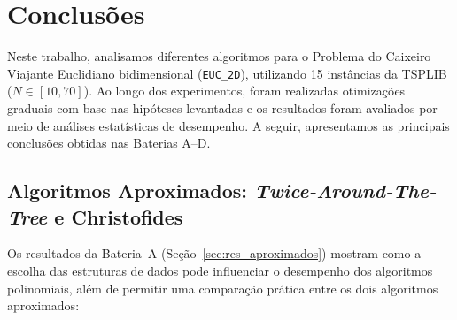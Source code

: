 \section{Conclusões}
\label{sec:conclusoes}

Neste trabalho, analisamos diferentes algoritmos para o Problema do Caixeiro Viajante Euclidiano bidimensional (\texttt{EUC\_2D}), utilizando 15 instâncias da TSPLIB ($N \in [10, 70]$). Ao longo dos experimentos, foram realizadas otimizações graduais com base nas hipóteses levantadas e os resultados foram avaliados por meio de análises estatísticas de desempenho. A seguir, apresentamos as principais conclusões obtidas nas Baterias A--D.

\subsection{Algoritmos Aproximados: \textit{Twice-Around-The-Tree} e Christofides}
\label{sec:conc_aproximados}

Os resultados da Bateria~A (Seção~\ref{sec:res_aproximados}) mostram como a escolha das estruturas de dados pode influenciar o desempenho dos algoritmos polinomiais, além de permitir uma comparação prática entre os dois algoritmos aproximados:

